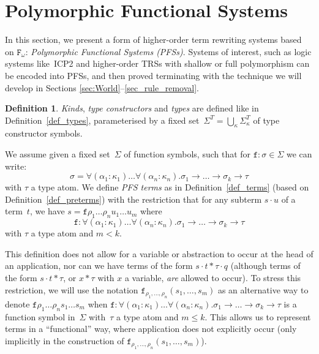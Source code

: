 \documentclass[a4paper,UKenglish,cleveref,autoref,numberwithinsect]{lipics-v2019}
\theoremstyle{definition}
\newtheorem{defn}[theorem]{Definition}
\newcommand{\Fomega}{\mathtt{F}_\omega}
\newcommand{\arrtype}{\rightarrow}
\newcommand{\app}[2]{#1 \cdot #2}
\begin{document}
\section{Polymorphic Functional Systems}\label{sec_systems}

In this section, we present a form of higher-order term rewriting
systems based on $\Fomega$: \emph{Polymorphic Functional Systems
  (PFSs)}. Systems of interest, such as logic systems like~ICP2 and
higher-order TRSs with shallow or full polymorphism can be encoded
into PFSs, and then proved terminating with the technique we will
develop in Sections \ref{sec:World}--\ref{sec_rule_removal}.

\begin{defn}\label{def_pafs_types_terms}
  \emph{Kinds}, \emph{type constructors} and \emph{types} are defined
  like in Definition~\ref{def_types}, parameterised by a fixed
  set~$\Sigma^T = \bigcup_{\kappa}\Sigma^T_\kappa$ of type constructor
  symbols.

  We assume given a fixed set~$\Sigma$ of function symbols, such
\pagebreak
  that for $\mathtt{f} : \sigma \in \Sigma$ we can write:
    \[
    \sigma = \forall (\alpha_1 : \kappa_1) \ldots \forall (\alpha_n : \kappa_n)
    . \sigma_1 \arrtype \ldots \arrtype \sigma_k \arrtype \tau
    \]
  with $\tau$ a type atom. We define \emph{PFS
    terms} as in Definition~\ref{def_terms} (based on
  Definition~\ref{def_preterms}) with the restriction that
  for any subterm $\app{s}{u}$ of a term~$t$, we have $s =
    \mathtt{f} \rho_1 \ldots \rho_n u_1 \ldots u_m$ where
    \[
    \mathtt{f} : \forall (\alpha_1 : \kappa_1) \ldots
    \forall (\alpha_n : \kappa_n) . \sigma_1 \arrtype \ldots \arrtype
    \sigma_k \arrtype \tau
    \]
    with $\tau$ a type atom and $m < k$.
\end{defn}

This definition does not allow for a variable or
abstraction to occur at the head of an application, nor can we have
terms of the form $s \cdot t * \tau \cdot q$ (although terms of the
form $s \cdot t * \tau$, or $x * \tau$ with $x$ a variable,
\emph{are} allowed to occur).  To stress this restriction, we will
use the notation
$\mathtt{f}_{\rho_1,\ldots,\rho_n}(s_1,\ldots,s_m)$ as an alternative
way to denote
$\mathtt{f} \rho_1 \ldots \rho_n s_1 \ldots s_m$ when
$
  \mathtt{f} : \forall (\alpha_1 : \kappa_1) \ldots
  \forall (\alpha_n : \kappa_n) . \sigma_1 \arrtype \ldots \arrtype
  \sigma_k \arrtype \tau
$
is a function symbol in~$\Sigma$ with~$\tau$ a type atom and $m \leq k$.
This allows us to represent terms in a ``functional'' way, where
application does not explicitly occur (only implicitly in the
construction of $\mathtt{f}_{\rho_1,\ldots,\rho_n}(s_1,\ldots,s_m)$).
\end{document}
